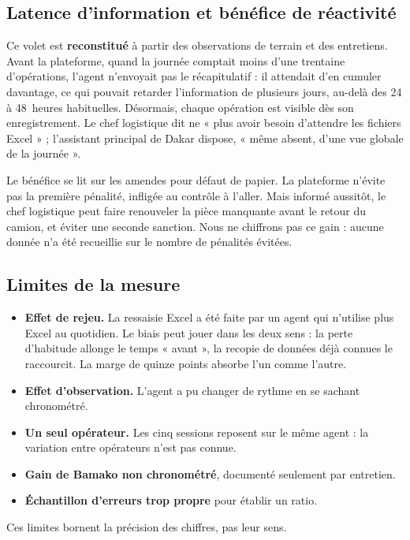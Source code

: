 \subsection{Latence d'information et bénéfice de réactivité}
\label{sec:impact_latence}

Ce volet est \textbf{reconstitué} à partir des observations de terrain et des entretiens. Avant la plateforme, quand la journée comptait moins d'une trentaine d'opérations, l'agent n'envoyait pas le récapitulatif : il attendait d'en cumuler davantage, ce qui pouvait retarder l'information de plusieurs jours, au-delà des 24 à 48~heures habituelles. Désormais, chaque opération est visible dès son enregistrement. Le chef logistique dit ne « plus avoir besoin d'attendre les fichiers Excel » ; l'assistant principal de Dakar dispose, « même absent, d'une vue globale de la journée ».

Le bénéfice se lit sur les amendes pour défaut de papier. La plateforme n'évite pas la première pénalité, infligée au contrôle à l'aller. Mais informé aussitôt, le chef logistique peut faire renouveler la pièce manquante avant le retour du camion, et éviter une seconde sanction. Nous ne chiffrons pas ce gain : aucune donnée n'a été recueillie sur le nombre de pénalités évitées.

\subsection{Limites de la mesure}
\label{sec:impact_limites}

\begin{itemize}
    \item \textbf{Effet de rejeu.} La ressaisie Excel a été faite par un agent qui n'utilise plus Excel au quotidien. Le biais peut jouer dans les deux sens : la perte d'habitude allonge le temps « avant », la recopie de données déjà connues le raccourcit. La marge de quinze points absorbe l'un comme l'autre.
    \item \textbf{Effet d'observation.} L'agent a pu changer de rythme en se sachant chronométré.
    \item \textbf{Un seul opérateur.} Les cinq sessions reposent sur le même agent : la variation entre opérateurs n'est pas connue.
    \item \textbf{Gain de Bamako non chronométré}, documenté seulement par entretien.
    \item \textbf{Échantillon d'erreurs trop propre} pour établir un ratio.
\end{itemize}
Ces limites bornent la précision des chiffres, pas leur sens.

